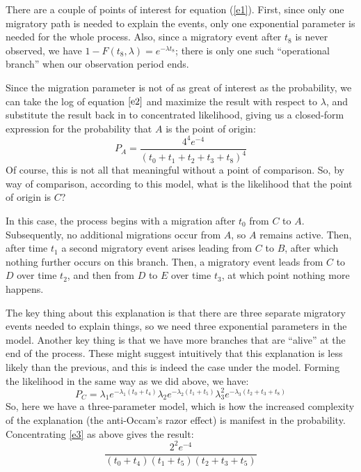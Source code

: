 \documentclass[11pt]{article}
\begin{document}
There are a couple of points of interest for equation (\ref{e1}). First, since only one migratory path is needed to explain the events, only one
exponential parameter is needed for the whole process. Also, since a migratory event after $t_8$ is never observed, we have $1-F(t_8,\lambda) = e^{-\lambda t_8}$; there is only one such ``operational branch'' when our observation period ends. 

Since the migration parameter is not of as great of interest as the probability, we can take the log of equation $\ref{e2}$ and maximize the result with respect to $\lambda$, and substitute the result back in to concentrated likelihood, giving us a closed-form expression for the probability that $A$ is the point of origin:
\begin{equation} \label{e2}
P_A = \frac{4^4e^{-4}}{(t_0+t_1+t_2+t_3+t_8)^4}
\end{equation}
Of course, this is not all that meaningful without a point of comparison. So, by way of comparison, according to this model, what is the likelihood that the point of origin is $C$? 

In this case, the process begins with a migration after $t_0$ from $C$ to $A$. Subsequently, no additional migrations occur from $A$, so $A$ remains active. Then, after time $t_1$ a second migratory event arises leading from $C$ to $B$, after which nothing further occurs on this branch. Then, a migratory event leads from $C$ to $D$ over time $t_2$, and then from $D$ to $E$ over time $t_3$, at which point nothing more happens. 

The key thing about this explanation is that there are three separate migratory events needed to explain things, so we need three exponential parameters in the model. Another key thing is that we have more branches that are ``alive'' at the end of the process. These might suggest intuitively that this explanation is less likely than the previous, and this is indeed the case under the model. Forming the likelihood in the
same way as we did above, we have:
\begin{equation} \label{e3}
P_C = \lambda_1e^{-\lambda_1(t_0+t_4)} \lambda_2 e^{-\lambda_2 (t_1+t_5)}\lambda_3^2 e^{-\lambda_3 (t_2+t_3+t_8)}
\end{equation}
So, here we have a three-parameter model, which is how the increased complexity of the explanation (the anti-Occam's razor effect) is manifest in the probability. Concentrating \ref{e3} as above gives the result:
\begin{equation} \label{e4}
\frac{2^2e^{-4}}{(t_0+t_4)(t_1+t_5)(t_2+t_3+t_5)}
\end{equation}
\end{document}
